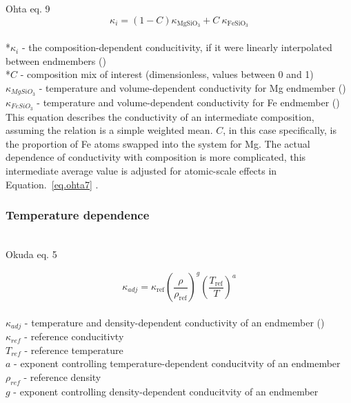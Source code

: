 Ohta eq. 9 
\begin{equation}%
\kappa_{i}=\left ( 1-C \right )\kappa_{\mathrm{MgSiO_{3}}}+C\ \kappa_{\mathrm{FeSiO_{3}}}
\label{eq.ohta9}
\end{equation}%
\\ *$\kappa_{i}$ - the composition-dependent conducitivity, if it were linearly interpolated between endmembers (\wmk)\\
*$C$ - composition mix of interest (dimensionless, values between 0 and 1)\\
$\kappa_{MgSiO_{3}}$ - temperature and volume-dependent conductivity for Mg endmember (\wmk)\\
$\kappa_{FeSiO_{3}}$ - temperature and volume-dependent conductivity for Fe endmember (\wmk)\\

This equation describes the conductivity of an intermediate composition, assuming the relation is a simple weighted mean. $C$, in this case specifically, is the proportion of Fe atoms swapped into the system for Mg. The actual dependence of conductivity with composition is more complicated, this intermediate average value is adjusted for atomic-scale effects in Equation.~\ref{eq.ohta7} \citep[][Eq. 7]{Ohta2017}. \\

\subsubsection{Temperature dependence}

\cite{Okuda2017}\\

Okuda eq. 5 

\begin{equation}%
\kappa_{adj}=\kappa_{\mathrm{ref}}\left ( \frac{\rho}{\rho_{\mathrm{ref}}} \right )^{g}\left ( \frac{T_{\mathrm{ref}}}{T} \right )^{a}
\label{eq.okuda5}
\end{equation}%
\\ $\kappa_{adj}$ - temperature and density-dependent conductivity of an endmember (\wmk)\\
$\kappa_{ref}$ - reference conducitivty\\
$T_{ref}$ - reference temperature\\
$a$ - exponent controlling temperature-dependent conducitvity of an endmember\\
$\rho_{ref}$ - reference density\\
$g$ - exponent controlling density-dependent conducitvity of an endmember\\


